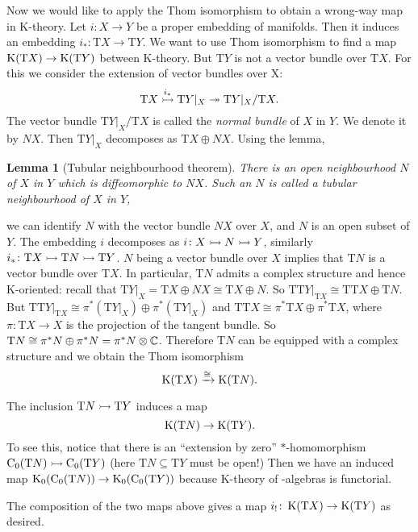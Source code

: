 \documentclass[reqno]{scrartcl}
\newtheorem{lemma}[theorem]{Lemma}
\theoremstyle{definition}
\theoremstyle{remark}
\begin{document}
Now we would like to apply the Thom isomorphism to obtain a wrong-way map in K-theory. Let $i\colon X\to Y$ be a proper embedding of manifolds. Then it induces an embedding $i_*\colon \mathrm{T}X\to \mathrm{T}Y$. We want to use Thom isomorphism to find a map $\operatorname{K}(\mathrm{T}X)\to\operatorname{K}(\mathrm{T}Y)$ between K-theory. But $\mathrm{T}Y$ is not a vector bundle over $\mathrm{T}X$. For this we consider the extension of vector bundles over X:
\[ \mathrm{T}X\overset{i_*}{\rightarrowtail}\mathrm{T}Y|_X\twoheadrightarrow \mathrm{T}Y|_X/\mathrm{T}X. \]  
The vector bundle $\mathrm{T}Y|_X/\mathrm{T}X$ is called the \emph{normal bundle} of $X$ in $Y$. We denote it by $NX$. Then $\mathrm{T}Y|_X$ decomposes as $\mathrm{T}X\oplus NX$. Using the lemma,
\begin{lemma}[Tubular neighbourhood theorem]
There is an open neighbourhood $N$ of $X$ in $Y$ which is diffeomorphic to $NX$. Such an $N$ is called a tubular neighbourhood of $X$ in $Y$,
\end{lemma}
we can identify $N$ with the vector bundle $NX$ over $X$, and $N$ is an open subset of $Y$. The embedding $i$ decomposes as $i\colon X\rightarrowtail N\rightarrowtail Y$, similarly $i_*\colon \mathrm{T}X\rightarrowtail \mathrm{T}N\rightarrowtail \mathrm{T}Y$. $N$ being a vector bundle over $X$ implies that $\mathrm{T}N$ is a vector bundle over $\mathrm{T}X$. In particular, $\mathrm{T}N$ admits a complex structure and hence K-oriented: recall that $\mathrm{T}Y|_X=\mathrm{T}X\oplus NX\cong \mathrm{T}X\oplus N$. So $\mathrm{TT}Y|_{\mathrm{T}X}\cong \mathrm{TT}X\oplus \mathrm{T}N$. But $\mathrm{TT}Y|_{\mathrm{T}X}\cong \pi^*(\mathrm{T}Y|_X)\oplus\pi^*(\mathrm{T}Y|_X)$ and $\mathrm{TT}X\cong\pi^*\mathrm{T}X\oplus\pi^*\mathrm{T}X$, where $\pi\colon \mathrm{T}X\to X$ is the projection of the tangent bundle. So $\mathrm{T}N\cong\pi^*N\oplus\pi^*N=\pi^*N\otimes\mathbb{C}$. Therefore $\mathrm{T}N$ can be equipped with a complex structure and we obtain the Thom isomorphism
\[ \operatorname{K}(\mathrm{T}X)\xrightarrow{\cong}\operatorname{K}(\mathrm{T}N). \]

The inclusion $\mathrm{T}N\rightarrowtail \mathrm{T}Y$ induces a map
\[ \operatorname{K}(\mathrm{T}N)\to\operatorname{K}(\mathrm{T}Y). \]
To see this, notice that there is an ``extension by zero'' $\ast$-homomorphism $\mathrm{C}_0(\mathrm{T}N)\rightarrowtail\mathrm{C}_0(\mathrm{T}Y)$ (here $\mathrm{T}N\subseteq \mathrm{T}Y$ must be open!) Then we have an induced map $\operatorname{K}_0(\mathrm{C}_0(\mathrm{T}N))\to\operatorname{K}_0(\mathrm{C}_0(\mathrm{T}Y))$ because K-theory of \Cst-algebras is functorial.

The composition of the two maps above gives a map $i_!\colon\operatorname{K}(\mathrm{T}X)\to\operatorname{K}(\mathrm{T}Y)$ as desired.
\end{document}
